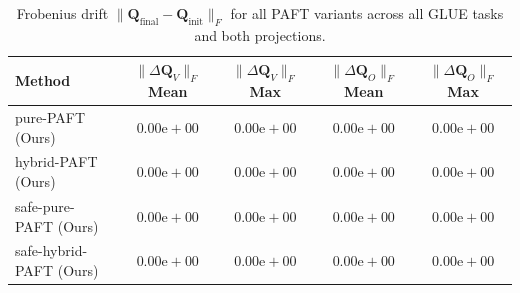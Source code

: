 \begin{table}[t]
\centering
\caption{Frobenius drift $\|\mathbf{Q}_{\text{final}} - \mathbf{Q}_{\text{init}}\|_F$ for all PAFT variants across all GLUE tasks and both projections.}
\label{tab:q_drift}
\begin{tabular}{lcccc}
\toprule
\textbf{Method} & $\|\Delta\mathbf{Q}_V\|_F$ \textbf{Mean} & $\|\Delta\mathbf{Q}_V\|_F$ \textbf{Max} & $\|\Delta\mathbf{Q}_O\|_F$ \textbf{Mean} & $\|\Delta\mathbf{Q}_O\|_F$ \textbf{Max} \\
\midrule
pure-PAFT (Ours) & $0.00\text{e}{+}00$ & $0.00\text{e}{+}00$ & $0.00\text{e}{+}00$ & $0.00\text{e}{+}00$ \\
hybrid-PAFT (Ours) & $0.00\text{e}{+}00$ & $0.00\text{e}{+}00$ & $0.00\text{e}{+}00$ & $0.00\text{e}{+}00$ \\
safe-pure-PAFT (Ours) & $0.00\text{e}{+}00$ & $0.00\text{e}{+}00$ & $0.00\text{e}{+}00$ & $0.00\text{e}{+}00$ \\
safe-hybrid-PAFT (Ours) & $0.00\text{e}{+}00$ & $0.00\text{e}{+}00$ & $0.00\text{e}{+}00$ & $0.00\text{e}{+}00$ \\
\bottomrule
\end{tabular}
\end{table}